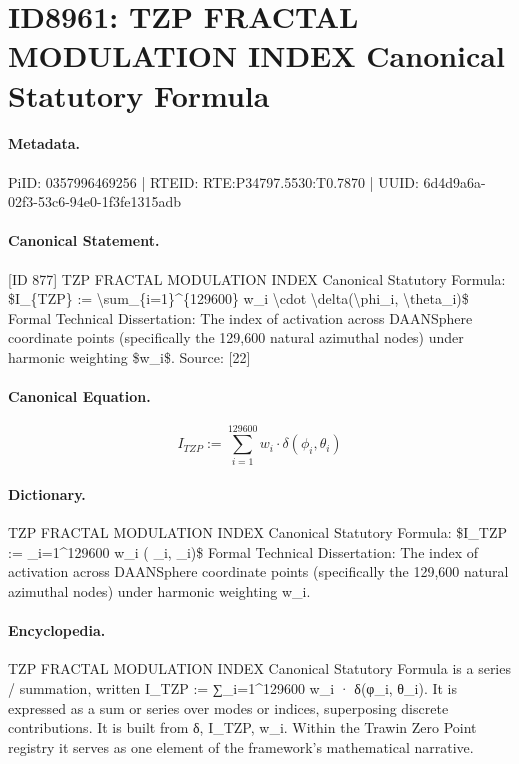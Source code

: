 \section*{ID8961: TZP FRACTAL MODULATION INDEX Canonical Statutory Formula}
\paragraph{Metadata.}
PiID: 0357996469256 | RTEID: RTE:P34797.5530:T0.7870 | UUID: 6d4d9a6a-02f3-53c6-94e0-1f3fe1315adb

\paragraph{Canonical Statement.}
[ID 877] TZP FRACTAL MODULATION INDEX Canonical Statutory Formula: \$I\_\{TZP\} := \textbackslash{}sum\_\{i=1\}\textasciicircum{}\{129600\} w\_i \textbackslash{}cdot \textbackslash{}delta(\textbackslash{}phi\_i, \textbackslash{}theta\_i)\$ Formal Technical Dissertation: The index of activation across DAANSphere coordinate points (specifically the 129,600 natural azimuthal nodes) under harmonic weighting \$w\_i\$. Source: [22]

\paragraph{Canonical Equation.}
\[
I_{TZP} := \sum_{i=1}^{129600} w_i \cdot \delta(\phi_i, \theta_i)
\]

\paragraph{Dictionary.}
TZP FRACTAL MODULATION INDEX Canonical Statutory Formula: \$I\_TZP := \_i=1\textasciicircum{}129600 w\_i ( \_i, \_i)\$ Formal Technical Dissertation: The index of activation across DAANSphere coordinate points (specifically the 129,600 natural azimuthal nodes) under harmonic weighting w\_i.

\paragraph{Encyclopedia.}
TZP FRACTAL MODULATION INDEX Canonical Statutory Formula is a series / summation, written I\_TZP := ∑\_i=1\textasciicircum{}129600 w\_i · δ(φ\_i, θ\_i). It is expressed as a sum or series over modes or indices, superposing discrete contributions. It is built from δ, I\_TZP, w\_i. Within the Trawin Zero Point registry it serves as one element of the framework's mathematical narrative.
